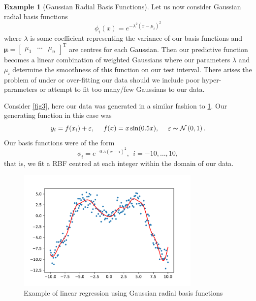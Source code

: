 \documentclass[10pt,a4paper]{article}
\numberwithin{equation}{section}
\theoremstyle{plain}
\theoremstyle{definition}
\theoremstyle{own}
\newtheorem{example}{Example}[section]
\begin{document}
\begin{example}[Gaussian Radial Basis Functions]
Let us now consider Gaussian radial basis functions
\begin{equation}
\phi_i(x) = e^{-\lambda^{2} ( x - \mu_i ) ^{2} }
\end{equation}
where $\lambda$ is some coefficient representing the variance of our basis functions and $\boldsymbol\mu = \left[ \begin{matrix} \mu_1 & \cdots & \mu_n \end{matrix} \right]^{\text{T}}$ are centres for each Gaussian. Then our predictive function becomes a linear combination of weighted Gaussians where our parameters $\lambda$ and $\mu_i$ determine the smoothness of this function on our test interval. There arises the problem of under or over-fitting our data should we include poor hyper-parameters or attempt to fit too many/few Gaussians to our data.

Consider \cref{fig3}, here our data was generated in a similar fashion to \cref{rbf}. Our generating function in this case was
\begin{equation}
y_i = f(x_i) + \varepsilon, ~~~~ f(x) = x \sin(0.5x), ~~~~ \varepsilon \thicksim \mathcal{N} \left( 0, 1 \right).
\end{equation}
Our basis functions were of the form
\begin{equation}
\phi_i = e^{-0.5 ( x - i ) ^{2} },~~ i = -10, \ldots, 10,
\end{equation}
that is, we fit a RBF centred at each integer within the domain of our data.
\begin{figure}[H]
\centering
\includegraphics[width = 0.8\textwidth]{f5}
\caption{Example of linear regression using Gaussian radial basis functions}
\label{rbf}
\end{figure}
\end{example}
\end{document}
